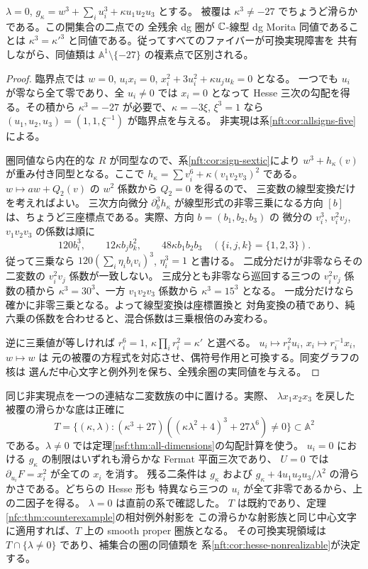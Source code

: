 \begin{corollary}[非実現ファイバーの一変数分類]\label{nft:cor:hesse-nonrealizable}
$\lambda=0$, $g_\kappa=w^3+\sum_i u_i^3+\kappa u_1u_2u_3$ とする。
被覆は $\kappa^3\ne-27$ でちょうど滑らかである。この開集合の二点での
全残余 dg 圏が $\mathbb C$-線型 dg Morita 同値であることは
$\kappa^3={\kappa'}^3$ と同値である。従ってすべてのファイバーが可換実現障害を
共有しながら、同値類は $\mathbb A^1\setminus\{-27\}$ の複素点で区別される。
\end{corollary}
\begin{proof}
臨界点では $w=0$, $u_i x_i=0$, $x_i^2+3u_i^2+\kappa u_j u_k=0$ となる。
一つでも $u_i$ が零なら全て零であり、全 $u_i\ne0$ では
$x_i=0$ となって Hesse 三次の勾配を得る。その積から
$\kappa^3=-27$ が必要で、$\kappa=-3\xi$, $\xi^3=1$ なら
$(u_1,u_2,u_3)=(1,1,\xi^{-1})$ が臨界点を与える。
非実現は系\ref{nft:cor:allsigns-five}による。

圏同値なら内在的な $R$ が同型なので、系\ref{nft:cor:sign-sextic}により
$w^3+h_\kappa(v)$ が重み付き同型となる。ここで
$h_\kappa=\sum v_i^6+\kappa(v_1v_2v_3)^2$ である。
$w\mapsto a w+Q_2(v)$ の $w^2$ 係数から $Q_2=0$ を得るので、
三変数の線型変換だけを考えればよい。
三次方向微分 $\partial_b^3h_\kappa$ が線型形式の非零三乗になる方向
$[b]$ は、ちょうど三座標点である。実際、方向 $b=(b_1,b_2,b_3)$ の
微分の $v_i^3$, $v_i^2v_j$, $v_1v_2v_3$ の係数は順に
\[
 120b_i^3,\qquad 12\kappa b_j b_k^2,\qquad 48\kappa b_1b_2b_3
 \quad(\{i,j,k\}=\{1,2,3\}).
\]
従って三乗なら $120(\sum_i\eta_i b_i v_i)^3$, $\eta_i^3=1$ と書ける。
二成分だけが非零ならその二変数の $v_i^2v_j$ 係数が一致しない。
三成分とも非零なら巡回する三つの $v_i^2v_j$ 係数の積から
$\kappa^3=30^3$、一方 $v_1v_2v_3$ 係数から $\kappa^3=15^3$ となる。
一成分だけなら確かに非零三乗となる。よって線型変換は座標置換と
対角変換の積であり、純六乗の係数を合わせると、混合係数は三乗根倍のみ変わる。

逆に三乗値が等しければ $r_i^6=1$, $\kappa\prod_i r_i^2=\kappa'$ と選べる。
$u_i\mapsto r_i^2u_i$, $x_i\mapsto r_i^{-1}x_i$, $w\mapsto w$ は
元の被覆の方程式を対応させ、偶符号作用と可換する。同変グラフの核は
選んだ中心文字と例外列を保ち、全残余圏の実同値を与える。
\end{proof}

同じ非実現点を一つの連結な二変数族の中に置ける。実際、
$\lambda x_1x_2x_3$ を戻した被覆の滑らかな底は正確に
\[
 T=\{(\kappa,\lambda):
 (\kappa^3+27)((\kappa\lambda^2+4)^3+27\lambda^6)\ne0\}\subset\mathbb A^2
\]
である。$\lambda\ne0$ では定理\ref{nsf:thm:all-dimensions}の勾配計算を使う。
$u_i=0$ における $g_\kappa$ の制限はいずれも滑らかな Fermat 平面三次であり、
$U=0$ では $\partial_{u_i}F=x_i^2$ が全ての $x_i$ を消す。
残る二条件は $g_\kappa$ および
$g_\kappa+4u_1u_2u_3/\lambda^2$ の滑らかさである。どちらの Hesse 形も
特異なら三つの $u_i$ が全て非零であるから、上の二因子を得る。
$\lambda=0$ は直前の系で確認した。
$T$ は既約であり、定理\ref{nfc:thm:counterexample}の相対例外射影を
この滑らかな射影族と同じ中心文字に適用すれば、$T$ 上の smooth proper 圏族となる。
その可換実現領域は $T\cap\{\lambda\ne0\}$ であり、補集合の圏の同値類を
系\ref{nft:cor:hesse-nonrealizable}が決定する。
